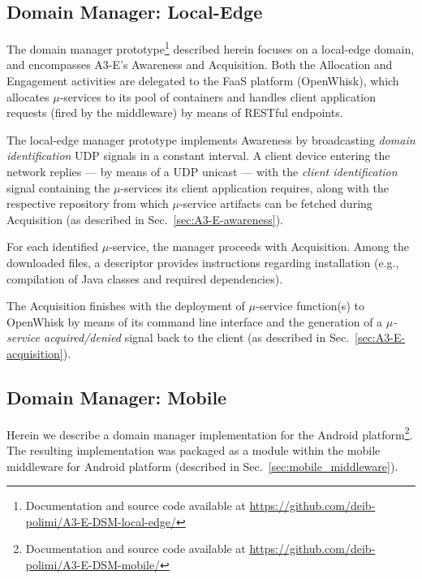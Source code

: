 \subsection{Domain Manager: Local-Edge}\label{sec:local-edge-domain-DSM}


The domain manager prototype\footnote{Documentation and source code available at \url{https://github.com/deib-polimi/A3-E-DSM-local-edge/}} described herein focuses on a local-edge domain, and encompasses A3-E's Awareness and Acquisition. Both the Allocation and Engagement activities are delegated to the FaaS platform (OpenWhisk), which allocates $\mu$-services to its pool of containers and handles client application requests (fired by the middleware) by means of RESTful endpoints.

The local-edge manager prototype implements Awareness by broadcasting \textit{domain identification} UDP signals in a constant interval. A client device entering the network replies --- by means of a UDP unicast --- with the \textit{client identification} signal containing the $\mu$-services its client application requires, along with the respective repository from which $\mu$-service artifacts can be fetched during Acquisition (as described in Sec.~\ref{sec:A3-E-awareness}). 

For each identified $\mu$-service, the manager proceeds with Acquisition. Among the downloaded files, a descriptor provides instructions regarding installation (e.g., compilation of Java classes and required dependencies). 

The Acquisition finishes with the deployment of $\mu$-service function(s) to OpenWhisk by means of its command line interface and the generation of a \textit{$\mu$-service acquired/denied} signal back to the client (as described in Sec.~\ref{sec:A3-E-acquisition}).

\subsection{Domain Manager: Mobile}\label{sec:mobile-domain-DSM}

Herein we describe a domain manager implementation for the Android platform\footnote{Documentation and source code available at \url{https://github.com/deib-polimi/A3-E-DSM-mobile/}}. 
The resulting implementation was packaged as a module within the mobile middleware for Android platform (described in Sec.~\ref{sec:mobile_middleware}). 

